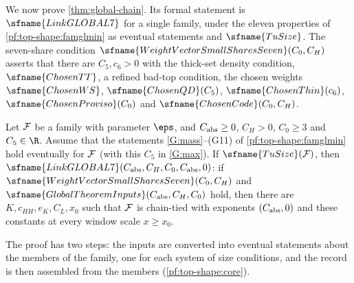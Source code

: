 We now prove \cref{thm:global-chain}. Its formal statement is $\sfname{LinkGLOBAL7}$ for a single family, under the
eleven properties of \cref{pf:top-shape:famglmin} as eventual statements and $\sfname{TuSize}$. The seven-share
condition $\sfname{WeightVectorSmallSharesSeven}(C_0,C_H)$ asserts that there are $C_5,c_6>0$ with the thick-set
density condition, $\sfname{ChosenTT}$, a refined bad-top condition, the chosen weights $\sfname{ChosenWS}$,
$\sfname{ChosenQD}(C_5)$, $\sfname{ChosenThin}(c_6)$, $\sfname{ChosenProviso}(C_0)$ and $\sfname{ChosenCode}(C_0,C_H)$.

\begin{theorem}\label{pf:top-shape:globalthm}
Let $\mathcal{F}$ be a family with parameter $\eps$, and $C_{\rm abs}\ge0$, $C_H>0$, $C_0\ge3$ and $C_5\in\R$. Assume
that the statements \ref{G:mass}--(G11) of \cref{pf:top-shape:famglmin} hold eventually for $\mathcal{F}$ (with this
$C_5$ in \ref{G:max}). If $\sfname{TuSize}(\topshapeF)$, then $\sfname{LinkGLOBAL7}(C_{\rm abs},C_H,C_0,C_{\rm abs},0)$:
if $\sfname{WeightVectorSmallSharesSeven}(C_0,C_H)$ and $\sfname{GlobalTheoremInputs}(C_{\rm abs},C_H,C_0)$ hold, then
there are $K,c_{HH},e_K,C_L,x_0$ such that $\mathcal{F}$ is chain-tied with exponents $(C_{\rm abs},0)$ and these
constants at every window scale $x\ge x_0$.
\end{theorem}

The proof has two steps: the inputs are converted into eventual statements about the members of the family, one
for each system of size conditions, and the record is then assembled from the members (\cref{pf:top-shape:core}).

